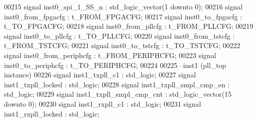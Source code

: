 \begin{DoxyCode}
00215 \textcolor{keywordflow}{signal} \textcolor{vhdlchar}{inst0_spi_1_SS_n}          \textcolor{vhdlchar}{:} \textcolor{comment}{std\_logic\_vector}\textcolor{vhdlchar}{(}\textcolor{vhdllogic}{}\textcolor{vhdllogic}{1} \textcolor{keywordflow}{downto} \textcolor{vhdllogic}{}\textcolor{vhdllogic}{0}\textcolor{vhdlchar}{)};
00216 \textcolor{keywordflow}{signal} \textcolor{vhdlchar}{inst0_from_fpgacfg}        \textcolor{vhdlchar}{:} \textcolor{vhdlchar}{t_FROM_FPGACFG};
00217 \textcolor{keywordflow}{signal} \textcolor{vhdlchar}{inst0_to_fpgacfg}          \textcolor{vhdlchar}{:} \textcolor{vhdlchar}{t_TO_FPGACFG};
00218 \textcolor{keywordflow}{signal} \textcolor{vhdlchar}{inst0_from_pllcfg}         \textcolor{vhdlchar}{:} \textcolor{vhdlchar}{t_FROM_PLLCFG};
00219 \textcolor{keywordflow}{signal} \textcolor{vhdlchar}{inst0_to_pllcfg}           \textcolor{vhdlchar}{:} \textcolor{vhdlchar}{t_TO_PLLCFG};
00220 \textcolor{keywordflow}{signal} \textcolor{vhdlchar}{inst0_from_tstcfg}         \textcolor{vhdlchar}{:} \textcolor{vhdlchar}{t_FROM_TSTCFG};
00221 \textcolor{keywordflow}{signal} \textcolor{vhdlchar}{inst0_to_tstcfg}           \textcolor{vhdlchar}{:} \textcolor{vhdlchar}{t_TO_TSTCFG};
00222 \textcolor{keywordflow}{signal} \textcolor{vhdlchar}{inst0_from_periphcfg}      \textcolor{vhdlchar}{:} \textcolor{vhdlchar}{t_FROM_PERIPHCFG};
00223 \textcolor{keywordflow}{signal} \textcolor{vhdlchar}{inst0_to_periphcfg}        \textcolor{vhdlchar}{:} \textcolor{vhdlchar}{t_TO_PERIPHCFG};
00224 
00225 \textcolor{keyword}{--inst1 (pll\_top instance)}
00226 \textcolor{keywordflow}{signal} \textcolor{vhdlchar}{inst1_txpll_c1}            \textcolor{vhdlchar}{:} \textcolor{comment}{std\_logic};
00227 \textcolor{keywordflow}{signal} \textcolor{vhdlchar}{inst1_txpll_locked}        \textcolor{vhdlchar}{:} \textcolor{comment}{std\_logic};
00228 \textcolor{keywordflow}{signal} \textcolor{vhdlchar}{inst1_txpll_smpl_cmp_en}   \textcolor{vhdlchar}{:} \textcolor{comment}{std\_logic};
00229 \textcolor{keywordflow}{signal} \textcolor{vhdlchar}{inst1_txpll_smpl_cmp_cnt}  \textcolor{vhdlchar}{:} \textcolor{comment}{std\_logic\_vector}\textcolor{vhdlchar}{(}\textcolor{vhdllogic}{}\textcolor{vhdllogic}{15} \textcolor{keywordflow}{downto} \textcolor{vhdllogic}{}\textcolor{vhdllogic}{0}\textcolor{vhdlchar}{)};
00230 \textcolor{keywordflow}{signal} \textcolor{vhdlchar}{inst1_rxpll_c1}            \textcolor{vhdlchar}{:} \textcolor{comment}{std\_logic};
00231 \textcolor{keywordflow}{signal} \textcolor{vhdlchar}{inst1_rxpll_locked}        \textcolor{vhdlchar}{:} \textcolor{comment}{std\_logic};

\end{DoxyCode}
